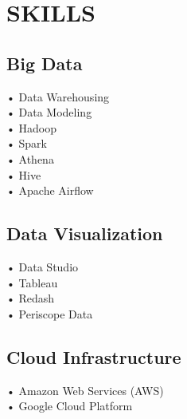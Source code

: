 \documentclass[letterpaper]{deedy-resume} %
\begin{document}

\lastupdated %



\begin{minipage}[t]{0.33\textwidth} %


\section{SKILLS}
\subsection{Big Data}
• Data Warehousing \\
• Data Modeling \\
• Hadoop \\
• Spark \\
• Athena \\
• Hive \\
• Apache Airflow  \\

\subsection{Data Visualization}
• Data Studio \\
• Tableau \\
• Redash \\
• Periscope Data \\

\subsection{Cloud Infrastructure}
• Amazon Web Services (AWS) \\
• Google Cloud Platform


\end{minipage}
\end{document}
